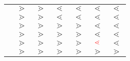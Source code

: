 \begin{tabular}{c | c c c c c c}
	 & \opplus{} & \opminus{} & \opmult{} & \opdiv{} & \oppow{} & \opfact{} \\
	\hline
	\opplus{} & $\gtrdot{}$ & $\gtrdot{}$ & $\lessdot{}$ & $\lessdot{}$ & $\lessdot{}$ & $\lessdot{}$ \\
	\opminus{} & $\gtrdot{}$ & $\gtrdot{}$ & $\lessdot{}$ & $\lessdot{}$ & $\lessdot{}$ & $\lessdot{}$ \\
	\opmult{} & $\gtrdot{}$ & $\gtrdot{}$ & $\gtrdot{}$ & $\gtrdot{}$ & $\lessdot{}$ & $\lessdot{}$ \\
	\opdiv{} & $\gtrdot{}$ & $\gtrdot{}$ & $\gtrdot{}$ & $\gtrdot{}$ & $\lessdot{}$ & $\lessdot{}$ \\
	\oppow{} & $\gtrdot{}$ & $\gtrdot{}$ & $\gtrdot{}$ & $\gtrdot{}$ & $\textcolor{red}{\lessdot{}}$ & $\lessdot{}$ \\
	\opfact{} & $\gtrdot{}$ & $\gtrdot{}$ & $\gtrdot{}$ & $\gtrdot{}$ & $\gtrdot{}$ & $\gtrdot{}$
\end{tabular}